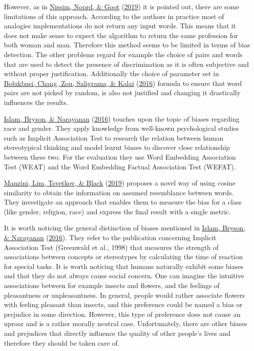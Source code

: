 \documentclass[
  12pt,
]{book}
\begin{document}
However, as in \protect\hyperlink{ref-Nissim2019Fair}{Nissim, Noord, \& Goot} (\protect\hyperlink{ref-Nissim2019Fair}{2019}) it is pointed out, there are some limitations of this approach. According to the authors in practice most of analogies implementations do not return any input words. This means that it does not make sense to expect the algorithm to return the same profession for both woman and man. Therefore this method seems to be limited in terms of bias detection. The other problems regard for example the
choice of pairs and words that are used to detect the presence of discrimination as it is often subjective and without proper justification. Additionally the choice of parameter set in \protect\hyperlink{ref-Bolukbasi2016Man}{Bolukbasi, Chang, Zou, Saligrama, \& Kalai} (\protect\hyperlink{ref-Bolukbasi2016Man}{2016}) formula to ensure that word pairs are not picked by random, is also not justified and changing it drastically
influences the results.

\protect\hyperlink{ref-Caliskan2017Semantics}{Islam, Bryson, \& Narayanan} (\protect\hyperlink{ref-Caliskan2017Semantics}{2016}) touches upon the topic of biases regarding race and gender. They apply knowledge from well-known psychological studies such as Implicit Association Test to research the relation between human stereotypical thinking and model learnt biases to
discover close relationship between these two. For the evaluation they use Word Embedding Association Test (WEAT) and the Word Embedding Factual Association Test (WEFAT).

\protect\hyperlink{ref-manzini2019black}{Manzini, Lim, Tsvetkov, \& Black} (\protect\hyperlink{ref-manzini2019black}{2019}) proposes a novel way of using cosine similarity to obtain the information on assumed resemblance between words. They investigate
an approach that enables them to measure the bias for a class (like gender, religion, race) and express the final result with a single metric.

It is worth noticing the general distinction of biases mentioned in \protect\hyperlink{ref-Caliskan2017Semantics}{Islam, Bryson, \& Narayanan} (\protect\hyperlink{ref-Caliskan2017Semantics}{2016}). They refer to the publication concerning Implicit Association Test (Greenwald et al., 1998) that measures the strength of associations between concepts or stereotypes by calculating the time of reaction for special tasks. It is worth noticing that humans naturally exhibit some biases and that they do not always cause social concern. One can imagine the intuitive associations between for example insects and flowers, and the feelings of pleasantness or unpleasantness. In general, people would rather associate flowers with feeling pleasant than insects, and this preference could be named a bias or
prejudice in some direction. However, this type of preference does not cause an uproar and is a rather morally neutral case. Unfortunately, there are other
biases and prejudices that directly influence the quality of other people's lives and therefore they should be taken care of.
\end{document}
